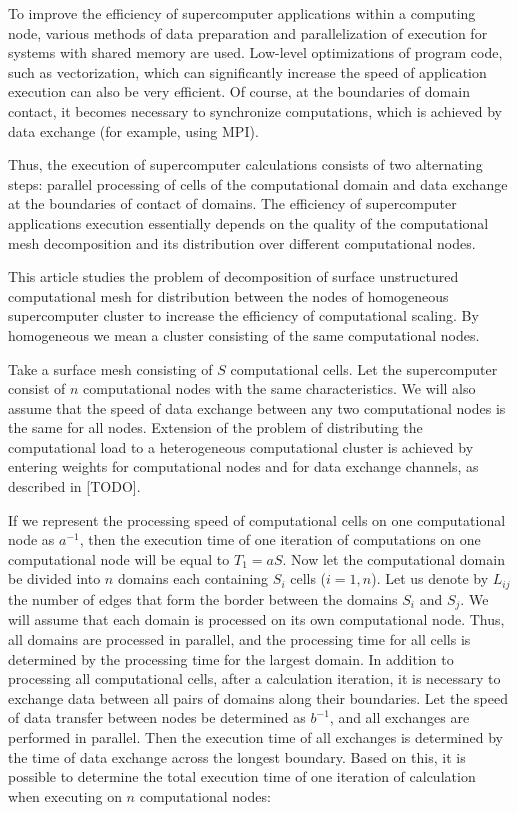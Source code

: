 \documentclass[
11pt,%
tightenlines,%
twoside,%
onecolumn,%
nofloats,%
nobibnotes,%
nofootinbib,%
superscriptaddress,%
noshowpacs,%
centertags]%
{revtex4}
\begin{document}
To improve the efficiency of supercomputer applications within a computing node, various methods of data preparation and parallelization of execution for systems with shared memory are used.
Low-level optimizations of program code, such as vectorization, which can significantly increase the speed of application execution can also be very efficient.
Of course, at the boundaries of domain contact, it becomes necessary to synchronize computations, which is achieved by data exchange (for example, using MPI).

Thus, the execution of supercomputer calculations consists of two alternating steps: parallel processing of cells of the computational domain and data exchange at the boundaries of contact of domains.
The efficiency of supercomputer applications execution essentially depends on the quality of the computational mesh decomposition and its distribution over different computational nodes.

This article studies the problem of decomposition of surface unstructured computational mesh for distribution between the nodes of homogeneous supercomputer cluster  to increase the efficiency of computational scaling.
By homogeneous we mean a cluster consisting of the same computational nodes.

Take a surface mesh consisting of $ S $ computational cells.
Let the supercomputer consist of $ n $ computational nodes with the same characteristics.
We will also assume that the speed of data exchange between any two computational nodes is the same for all nodes.
Extension of the problem of distributing the computational load to a heterogeneous computational cluster is achieved by entering weights for computational nodes and for data exchange channels, as described in [TODO].

If we represent the processing speed of computational cells on one computational node as $ a^{-1} $, then the execution time of one iteration of computations on one computational node will be equal to $ T_1 = aS $.
Now let the computational domain be divided into $ n $ domains each containing $ S_i $ cells ($ i = 1, n $).
Let us denote by $ L_{ij} $ the number of edges that form the border between the domains $ S_i $ and $ S_j $.
We will assume that each domain is processed on its own computational node.
Thus, all domains are processed in parallel, and the processing time for all cells is determined by the processing time for the largest domain.
In addition to processing all computational cells, after a calculation iteration, it is necessary to exchange data between all pairs of domains along their boundaries.
Let the speed of data transfer between nodes be determined as $ b^{-1} $, and all exchanges are performed in parallel.
Then the execution time of all exchanges is determined by the time of data exchange across the longest boundary.
Based on this, it is possible to determine the total execution time of one iteration of calculation when executing on $ n $ computational nodes:
\end{document}
